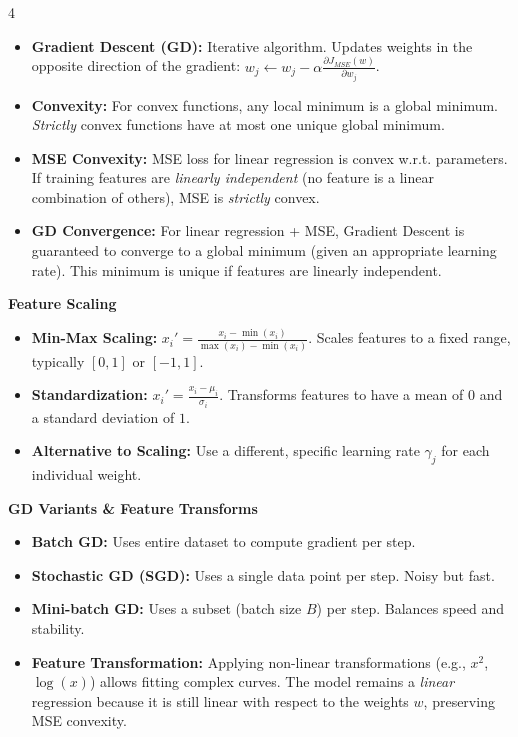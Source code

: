 \documentclass[8pt,landscape,a4paper]{extarticle}
\begin{document}
\begin{multicols*}{4}
\begin{itemize}[leftmargin=*, nosep]
    $\frac{\partial J_{MSE}(w)}{\partial w_j} = \frac{1}{n} \sum_{i=1}^n (h_w(x^{(i)}) - y^{(i)}) x_j^{(i)}$.
    \item \textbf{Gradient Descent (GD):} Iterative algorithm. Updates weights in the opposite direction of the gradient: $w_j \leftarrow w_j - \alpha \frac{\partial J_{MSE}(w)}{\partial w_j}$.
    \item \textbf{Convexity:} For convex functions, any local minimum is a global minimum. \textit{Strictly} convex functions have at most one unique global minimum.
    \item \textbf{MSE Convexity:} MSE loss for linear regression is convex w.r.t. parameters. If training features are \textit{linearly independent} (no feature is a linear combination of others), MSE is \textit{strictly} convex.
    \item \textbf{GD Convergence:} For linear regression + MSE, Gradient Descent is guaranteed to converge to a global minimum (given an appropriate learning rate). This minimum is unique if features are linearly independent.
\end{itemize}

\vspace{1mm}
\noindent\textbf{Feature Scaling}
\begin{itemize}[leftmargin=*, nosep]
    \item \textbf{Min-Max Scaling:} $x_i' = \frac{x_i - \min(x_i)}{\max(x_i) - \min(x_i)}$. Scales features to a fixed range, typically $[0,1]$ or $[-1,1]$.
    \item \textbf{Standardization:} $x_i' = \frac{x_i - \mu_i}{\sigma_i}$. Transforms features to have a mean of $0$ and a standard deviation of $1$.
    \item \textbf{Alternative to Scaling:} Use a different, specific learning rate $\gamma_j$ for each individual weight.
\end{itemize}

\vspace{1mm}
\noindent\textbf{GD Variants \& Feature Transforms}
\begin{itemize}[leftmargin=*, nosep]
    \item \textbf{Batch GD:} Uses entire dataset to compute gradient per step.
    \item \textbf{Stochastic GD (SGD):} Uses a single data point per step. Noisy but fast.
    \item \textbf{Mini-batch GD:} Uses a subset (batch size $B$) per step. Balances speed and stability.
    \item \textbf{Feature Transformation:} Applying non-linear transformations (e.g., $x^2$, $\log(x)$) allows fitting complex curves. The model remains a \textit{linear} regression because it is still linear with respect to the weights $w$, preserving MSE convexity.
\end{itemize}


\end{multicols*}
\end{document}
